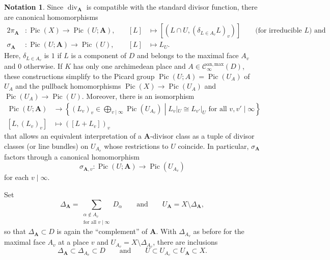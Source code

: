 \documentclass[a4paper, twoside, 10pt]{amsart}
\newcommand{\uA}{{\boldsymbol{A}}}
\newcommand{\cC}{\mathcal{C}}
\newcommand{\Canmax}{\cC^{\mathrm{an,max}}}
\DeclareMathOperator{\sdiv}{div}
\DeclareMathOperator{\Pic}{Pic}
\newcommand{\relmiddle}[1]{\mathrel{}\middle#1\mathrel{}}
\theoremstyle{definition}
\newtheorem{notation}[theorem]{Notation}
\begin{document}
\begin{notation}
  Since $\sdiv_\uA$ is compatible with the standard divisor function, there are canonical homomorphisms 
  \begin{alignat}{2}
    \label{eq:pi_A} \pi_\uA&\colon \Pic(X)\to\Pic(U;\uA), \quad
      &[L] &\mapsto [(L\cap U,(\delta_{L\in A_v} L)_v)] \qquad\text{(for irreducible $L$) and}\\
    \label{eq:sigma_A} \sigma_\uA&\colon\Pic(U;\uA)\to\Pic(U), 
      &[L]&\mapsto L_U.
  \end{alignat}
  Here, $\delta_{L\in A_v}$ is $1$ if $L$ is a component of $D$ and belongs to the maximal face $A_v$ and $0$ otherwise.
  If $K$ has only one archimedean place and $A\in \Canmax_\infty(D)$, these constructions simplify to the Picard group $\Pic(U;A)=\Pic(U_A)$ of $U_A$ and the pullback homomorphisms $\Pic(X)\to\Pic(U_A)$ and $\Pic(U_A)\to\Pic(U)$.
  Moreover, there is an isomorphism
  \begin{align*}
    \Pic(U;\uA) &\to \left\{(L_v)_v \in \bigoplus_{v\mid\infty} \Pic(U_{A_v})\relmiddle| L_v|_{U}\cong L_{v'}|_{U} \text{ for all $v,v'\mid\infty$}\right\} \\
    [L, (L_v)_v] &\mapsto ([L+L_v])_v
  \end{align*}
  that allows an equivalent interpretation of a $\uA$-divisor class as a tuple of divisor classes (or line bundles) on $U_{A_v}$ whose restrictions to $U$ coincide. In particular, $\sigma_\uA$ factors through a canonical homomorphism
  \[
    \sigma_{\uA,v} \colon \Pic(U;\uA) \to \Pic(U_{A_v})
  \]
  for each $v\mid\infty$.
\end{notation}

Set
\begin{equation}\label{eq:def-Delta_uA-U_uA}
  \Delta_{\uA}
  =\sum_{\substack{\alpha\not\in A_v\\\text{for all } v\mid\infty}}
  D_\alpha
  \qquad \text{and} \qquad
  U_\uA=X \setminus \Delta_{\uA},
\end{equation}
so that $\Delta_\uA \subset D$ is again the ``complement'' of $\uA$. With $\Delta_{A_v}$ as before for the maximal face $A_v$ at a place $v$ and $U_{A_v}=X\setminus \Delta_{A_v}$, there are inclusions
\[
    \Delta_\uA \subset \Delta_{A_v} \subset D
    \qquad \text{and} \qquad
    U\subset U_{A_v}\subset U_\uA \subset X.
\]
\end{document}
